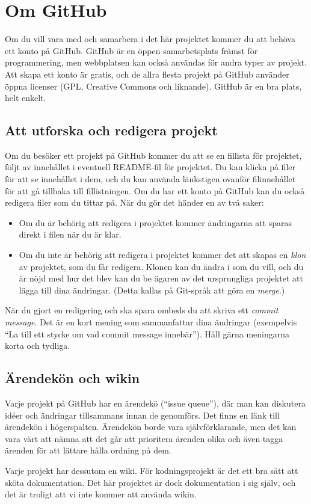 \section{Om GitHub}

Om du vill vara med och samarbera i det här projektet kommer du att behöva ett konto på GitHub.
GitHub är en öppen samarbetsplats främst för programmering, men webbplatsen kan också användas för andra typer av projekt.
Att skapa ett konto är gratis, och de allra flesta projekt på GitHub använder öppna licenser (GPL, Creative Commons och liknande).
GitHub är en bra plats, helt enkelt.


\subsection{Att utforska och redigera projekt}

Om du besöker ett projekt på GitHub kommer du att se en fillista för projektet, följt av innehållet i eventuell README-fil för projektet.
Du kan klicka på filer för att se innehållet i dem, och du kan använda länkstigen ovanför filinnehållet för att gå tillbaka till fillistningen.
Om du har ett konto på GitHub kan du också redigera filer som du tittar på.
När du gör det händer en av två saker:

\begin{itemize}

\item Om du är behörig att redigera i projektet kommer ändringarna att sparas direkt i filen när du är klar.
\item Om du inte är behörig att redigera i projektet kommer det att skapas en \emph{klon} av projektet, som du får redigera.
Klonen kan du ändra i som du vill, och du är nöjd med hur det blev kan du be ägaren av det ursprungliga projektet att lägga till dina ändringar.
(Detta kallas på Git-språk att göra en \emph{merge}.)

\end{itemize}

När du gjort en redigering och ska spara ombeds du att skriva ett \emph{commit message}.
Det är en kort mening som sammanfattar dina ändringar (exempelvis ``La till ett stycke om vad commit message innebär'').
Håll gärna meningarna korta och tydliga.


\subsection{Ärendekön och wikin}

Varje projekt på GitHub har en ärendekö (``issue queue''), där man kan diskutera idéer och ändringar tillsammans innan de genomförs.
Det finns en länk till ärendekön i högerspalten.
Ärendekön borde vara självförklarande, men det kan vara värt att nämna att det går att prioritera ärenden olika och även tagga ärenden för att lättare hålla ordning på dem.

Varje projekt har dessutom en wiki. För kodningsprojekt är det ett bra sätt att sköta dokumentation.
Det här projektet är dock dokumentation i sig själv, och det är troligt att vi inte kommer att använda wikin.
